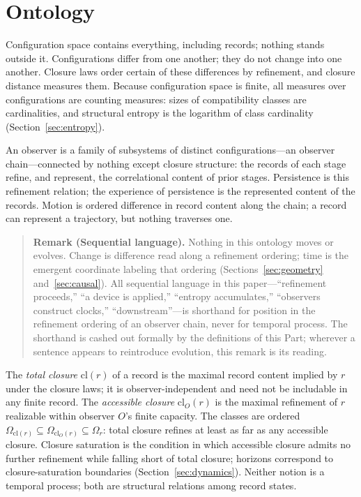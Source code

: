 \documentclass[11pt]{article}
\theoremstyle{definition}
\theoremstyle{remark}
\begin{document}
\section{Ontology}\label{sec:ontology}
Configuration space contains everything, including records; nothing stands outside it. Configurations differ from one another; they do not change into one another. Closure laws order certain of these differences by refinement, and closure distance measures them. Because configuration space is finite, all measures over configurations are counting measures: sizes of compatibility classes are cardinalities, and structural entropy is the logarithm of class cardinality (Section~\ref{sec:entropy}).

An observer is a family of subsystems of distinct configurations---an observer chain---connected by nothing except closure structure: the records of each stage refine, and represent, the correlational content of prior stages. Persistence is this refinement relation; the experience of persistence is the represented content of the records. Motion is ordered difference in record content along the chain; a record can represent a trajectory, but nothing traverses one.

\begin{quote}\textbf{Remark (Sequential language).} Nothing in this ontology moves or evolves. Change is difference read along a refinement ordering; time is the emergent coordinate labeling that ordering (Sections~\ref{sec:geometry} and~\ref{sec:causal}). All sequential language in this paper---``refinement proceeds,'' ``a device is applied,'' ``entropy accumulates,'' ``observers construct clocks,'' ``downstream''---is shorthand for position in the refinement ordering of an observer chain, never for temporal process. The shorthand is cashed out formally by the definitions of this Part; wherever a sentence appears to reintroduce evolution, this remark is its reading.\end{quote}

The \emph{total closure} $\mathrm{cl}(r)$ of a record is the maximal record content implied by $r$ under the closure laws; it is observer-independent and need not be includable in any finite record. The \emph{accessible closure} $\mathrm{cl}_O(r)$ is the maximal refinement of $r$ realizable within observer $O$'s finite capacity. The classes are ordered $\Omega_{\mathrm{cl}(r)} \subseteq \Omega_{\mathrm{cl}_O(r)} \subseteq \Omega_r$: total closure refines at least as far as any accessible closure. Closure saturation is the condition in which accessible closure admits no further refinement while falling short of total closure; horizons correspond to closure-saturation boundaries (Section~\ref{sec:dynamics}). Neither notion is a temporal process; both are structural relations among record states.
\end{document}
